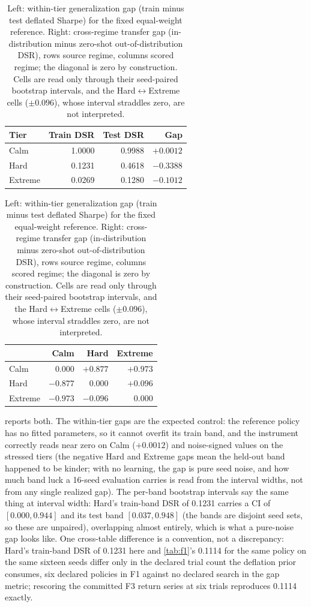 \begin{table}[t]
\centering
\caption{Left: within-tier generalization gap (train minus test deflated Sharpe) for the fixed equal-weight reference. Right: cross-regime transfer gap (in-distribution minus zero-shot out-of-distribution DSR), rows source regime, columns scored regime; the diagonal is zero by construction. Cells are read only through their seed-paired bootstrap intervals, and the Hard$\leftrightarrow$Extreme cells ($\pm 0.096$), whose interval straddles zero, are not interpreted.}
\label{tab:f3}
\small
\begin{tabular}{lrrr}
\toprule
Tier & Train DSR & Test DSR & Gap \\
\midrule
Calm & 1.0000 & 0.9988 & $+0.0012$ \\
Hard & 0.1231 & 0.4618 & $-0.3388$ \\
Extreme & 0.0269 & 0.1280 & $-0.1012$ \\
\bottomrule
\end{tabular}
\hspace{1.5em}
\begin{tabular}{lrrr}
\toprule
 & Calm & Hard & Extreme \\
\midrule
Calm & 0.000 & $+0.877$ & $+0.973$ \\
Hard & $-0.877$ & 0.000 & $+0.096$ \\
Extreme & $-0.973$ & $-0.096$ & 0.000 \\
\bottomrule
\end{tabular}
\end{table}
 reports both. The within-tier gaps are the expected control: the reference policy has no fitted parameters, so it cannot overfit its train band, and the instrument correctly reads near zero on Calm ($+0.0012$) and noise-signed values on the stressed tiers (the negative Hard and Extreme gaps mean the held-out band happened to be kinder; with no learning, the gap is pure seed noise, and how much band luck a 16-seed evaluation carries is read from the interval widths, not from any single realized gap). The per-band bootstrap intervals say the same thing at interval width: Hard's train-band DSR of 0.1231 carries a CI of $[0.000, 0.944]$ and its test band $[0.037, 0.948]$ (the bands are disjoint seed sets, so these are unpaired), overlapping almost entirely, which is what a pure-noise gap looks like. One cross-table difference is a convention, not a discrepancy: Hard's train-band DSR of 0.1231 here and \cref{tab:f1}'s 0.1114 for the same policy on the same sixteen seeds differ only in the declared trial count the deflation prior consumes, six declared policies in F1 against no declared search in the gap metric; rescoring the committed F3 return series at six trials reproduces 0.1114 exactly.

